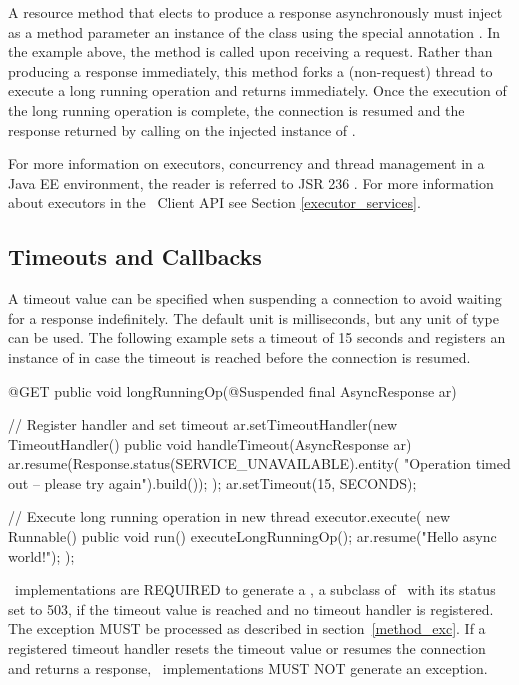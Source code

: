 A resource method that elects to produce a response asynchronously must inject as a method parameter an instance of the class  using the special annotation \Suspended. In the example above, the method  is called upon receiving a  request. Rather than producing a response immediately, this method forks a (non-request) thread to execute a long running operation and returns immediately. Once the execution of the long running operation is complete, the connection is resumed and the response returned by calling  on the injected instance of . 

For more information on executors, concurrency and thread management in a Java EE environment, the reader is referred to JSR 236 \cite{concurrencyee}. For more information about executors in the \jaxrs\ Client API see Section \ref{executor_services}.

\subsection{Timeouts and Callbacks}
\label{timeouts_and_callbacks}

A timeout value can be specified when suspending a connection to avoid waiting for a response indefinitely. The default unit is milliseconds, but any unit of type  can be used. The following example sets a timeout of 15 seconds and registers an instance of  in case the timeout is reached before the connection is resumed.

\begin{listing}{1}
    @GET
    public void longRunningOp(@Suspended final AsyncResponse ar) {
        // Register handler and set timeout
        ar.setTimeoutHandler(new TimeoutHandler() {
            public void handleTimeout(AsyncResponse ar) {
                ar.resume(Response.status(SERVICE_UNAVAILABLE).entity(
                    "Operation timed out -- please try again").build());                    
                }
        });
        ar.setTimeout(15, SECONDS);
        
        // Execute long running operation in new thread
        executor.execute(
            new Runnable() {
                public void run() {
                    executeLongRunningOp();
                    ar.resume("Hello async world!");
        } });
    }
\end{listing}

\jaxrs\ implementations are REQUIRED to generate a , a subclass of \WebApplicationException\ with its status set to 503, if the timeout value is reached and no timeout handler is registered. The exception MUST be processed as described in section~\ref{method_exc}. If a registered timeout handler resets the timeout value or resumes the connection and returns a response, \jaxrs\ implementations MUST NOT generate an exception.

